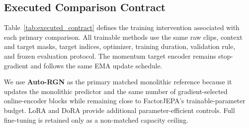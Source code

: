 \subsection{Executed Comparison Contract}
\label{app:attribution_contract}

Table~\ref{tab:executed_contract} defines the training intervention
associated with each primary comparison. All trainable methods use the
same raw clips, context and target masks, target indices, optimizer,
training duration, validation rule, and frozen evaluation protocol.
The momentum target encoder remains stop-gradient and follows the same
EMA update schedule.

We use \textbf{Auto-RGN} as the primary matched monolithic reference
because it updates the monolithic predictor and the same number of
gradient-selected online-encoder blocks while remaining close to
FactorJEPA's trainable-parameter budget. LoRA and DoRA provide
additional parameter-efficient controls. Full fine-tuning is retained
only as a non-matched capacity ceiling.


